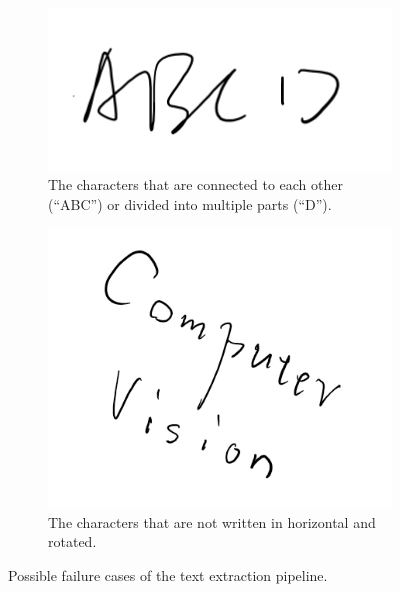 \documentclass[11pt]{article}
\begin{document}
\begin{figure}[h!]
    \begin{subfigure}{.495\textwidth}
      \centering
      \includegraphics[width=.5\linewidth]{../results/q4_1a.png}
      \caption{The characters that are connected to each other (``ABC'') or divided into multiple parts (``D''). }
    \end{subfigure}
    \begin{subfigure}{.495\textwidth}
      \centering
      \includegraphics[width=.5\linewidth]{../results/q4_1b.png}
      \caption{The characters that are not written in horizontal and rotated. }
    \end{subfigure}\hfill
    \caption{Possible failure cases of the text extraction pipeline. }
    \label{fig:q4.1}
\end{figure}
\end{document}
